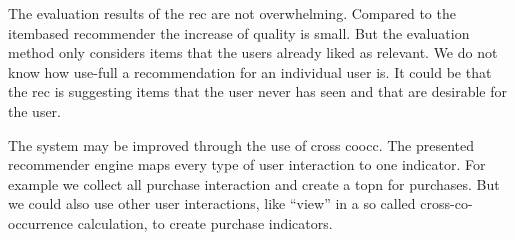 The evaluation results of the \gls{rec} are not overwhelming. Compared to the \gls{itembased} recommender the increase of quality is small. But the evaluation method only considers items that the users already liked as relevant. We do not know how use-full a recommendation for an individual user is. It could be that the \gls{rec} is suggesting items that the user never has seen and that are desirable for the user.

The system may be improved through the use of cross \gls{coocc}. The presented recommender engine maps every type of user interaction to one \gls{indicator}. For example we collect all purchase interaction and create a \gls{topn} for purchases. But we could also use other user interactions, like ``view'' in a so called cross-co-occurrence calculation, to create purchase indicators. 
